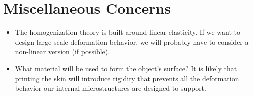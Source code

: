 \documentclass[10pt]{article}
\begin{document}
\section{Miscellaneous Concerns}
\begin{itemize}
    \item The homogenization theory is built around linear elasticity. If we want to
        design large-scale deformation behavior, we will probably have to
        consider a non-linear version (if possible).

    \item What material will be used to form the object's surface? It is likely
        that printing the skin will introduce rigidity that prevents all the
        deformation behavior our internal microstructures are designed to
        support.
\end{itemize}






\end{document}
